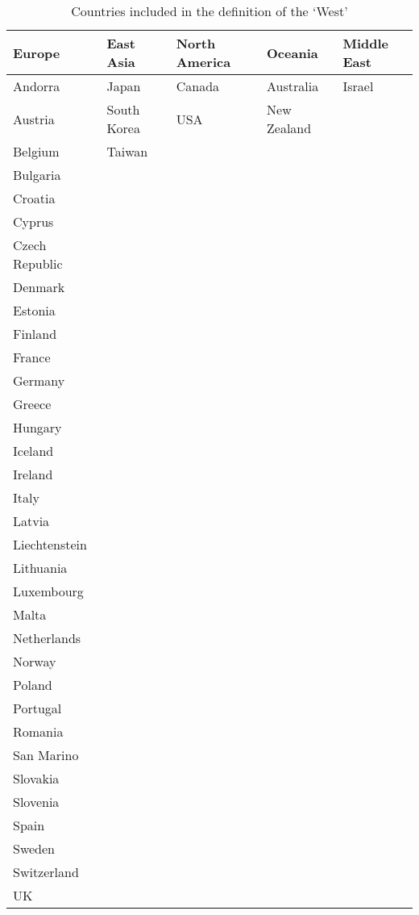 \begin{table}[H]
    \centering
    \caption{Countries included in the definition of the `West'}
    \label{tab:west}
    \vspace{0.5em}
    \begin{tabular}{lllll}
    \toprule
         Europe & East Asia & North America & Oceania & Middle East \\ 
    \midrule
         Andorra & Japan & Canada & Australia & Israel \\
         Austria & South Korea & USA & New Zealand & \\
         Belgium & Taiwan & & & \\
         Bulgaria & & & & \\
         Croatia & & & & \\
         Cyprus & & & & \\
         Czech Republic & & & & \\
         Denmark & & & & \\
         Estonia & & & & \\
         Finland & & & & \\
         France & & & & \\
         Germany & & & & \\ 
         Greece & & & & \\
         Hungary & & & & \\ 
         Iceland & & & & \\ 
         Ireland & & & & \\
         Italy & & & & \\
         Latvia & & & & \\ 
         Liechtenstein & & & & \\ 
         Lithuania & & & & \\
         Luxembourg & & & & \\ 
         Malta & & & & \\
         Netherlands & & & & \\
         Norway & & & & \\ 
         Poland & & & & \\
         Portugal & & & & \\
         Romania & & & & \\
         San Marino & & & & \\
         Slovakia & & & & \\ 
         Slovenia & & & & \\
         Spain & & & & \\ 
         Sweden & & & & \\
         Switzerland & & & & \\
         UK & & & & \\
    \bottomrule
    \end{tabular}
\end{table}

